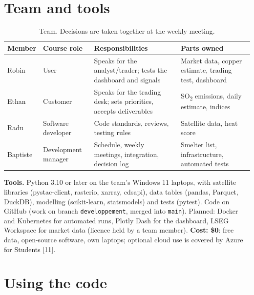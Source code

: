 \documentclass[10pt,a4paper]{article}
\newcommand{\SOtwo}{SO\textsubscript{2}}
\newcommand{\code}[1]{\texttt{\small #1}}
\begin{document}
\section{Team and tools}

\begin{table}[H]
\centering\small
\begin{tabularx}{\textwidth}{@{}l l X X@{}}
\toprule
\textbf{Member} & \textbf{Course role} & \textbf{Responsibilities} & \textbf{Parts owned}\\
\midrule
Robin & User & Speaks for the analyst/trader; tests the dashboard and signals & Market data, copper estimate, trading test, dashboard\\
Ethan & Customer & Speaks for the trading desk; sets priorities, accepts deliverables & \SOtwo{} emissions, daily estimate, indices\\
Radu & Software developer & Code standards, reviews, testing rules & Satellite data, heat score\\
Baptiste & Development manager & Schedule, weekly meetings, integration, decision log & Smelter list, infrastructure, automated tests\\
\bottomrule
\end{tabularx}
\caption{Team. Decisions are taken together at the weekly meeting.}
\end{table}

\textbf{Tools.} Python 3.10 or later on the team's Windows 11 laptops, with satellite libraries (pystac-client, rasterio, xarray, cdsapi), data tables (pandas, Parquet, DuckDB), modelling (scikit-learn, statsmodels) and tests (pytest). Code on GitHub (work on branch \code{developpement}, merged into \code{main}). Planned: Docker and Kubernetes for automated runs, Plotly Dash for the dashboard, LSEG Workspace for market data (licence held by a team member). \textbf{Cost: \$0}: free data, open-source software, own laptops; optional cloud use is covered by Azure for Students [11].

\appendix
\clearpage
\section{Using the code}
\end{document}
